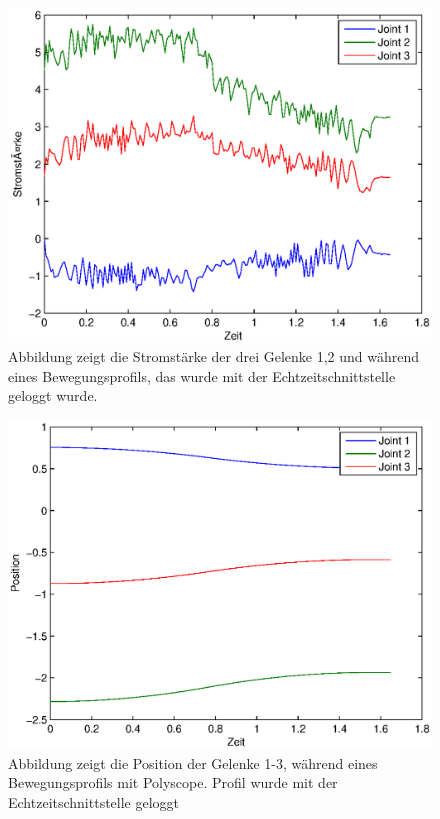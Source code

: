 \begin{figure}[H]
  \centering
    \includegraphics[width=1\textwidth]{pic/current_profile_polyscope.eps}
      \caption[Stromstärke wärend der Bewegung der Gelenke 1-3 mit Polyscope]{Abbildung zeigt die Stromstärke der drei Gelenke 1,2 und  während eines Bewegungsprofils, das wurde mit der Echtzeitschnittstelle geloggt wurde.}
      \label{fig:acceleration_profile_rci}
\end{figure}

\begin{figure}[H]
  \centering
    \includegraphics[width=1\textwidth]{pic/position_profile_polyscope.eps}
      \caption[Position wärend der Bewegung der Gelenke 1-3 mit Polyscope]{Abbildung zeigt die Position der Gelenke 1-3, während eines Bewegungsprofils mit Polyscope. Profil wurde mit der Echtzeitschnittstelle geloggt}
      \label{fig:position_joints_rci}
\end{figure}

